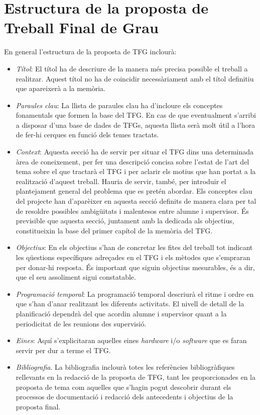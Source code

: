 \section{Estructura de la proposta de Treball Final de Grau}
En general l'estructura de la proposta de \ac{TFG} inclourà:
\begin{itemize}
\item \emph{Títol}: El títol ha de descriure de la manera més precisa possible el treball a realitzar. Aquest títol no ha de coincidir necessàriament amb el títol definitiu que apareixerà a la memòria.
\item \emph{Paraules clau}: La llista de paraules clau ha d'incloure els conceptes fonamentals que formen la base del \ac{TFG}. En cas de que eventualment s'arribi a disposar d'una base de dades de \ac{TFG}s, aquesta llista serà molt útil a l'hora de fer-hi cerques en funció dels temes tractats.
\item \emph{Context}: Aquesta secció ha de servir per situar el \ac{TFG} dins una determinada àrea de coneixement, per fer una descripció concisa sobre l'estat de l'art del tema sobre el que tractarà el \ac{TFG} i per aclarir els motius que han portat a la realització d'aquest treball. Hauria de servir, també, per introduir el plantejament general del problema que es pretén abordar. Els conceptes clau del projecte han d'aparèixer en aquesta secció definits de manera clara per tal de resoldre possibles ambigüitats i malentesos entre alumne i supervisor. És previsible que aquesta secció, juntament amb la dedicada als objectius, constitueixin la base del primer capítol de la memòria del \ac{TFG}.
\item \emph{Objectius}: En els objectius s'han de concretar les fites del treball tot indicant les qüestions específiques adreçades en el \ac{TFG} i els mètodes que s'empraran per donar-hi resposta. És important que siguin objectius mesurables, és a dir, que el seu assoliment sigui constatable.
\item \emph{Programació temporal}: La programació temporal descriurà el ritme i ordre en que s'han d'anar realitzant les diferents activitats. El nivell de detall de la planificació dependrà del que acordin alumne i supervisor quant a la periodicitat de les reunions des supervisió.
\item \emph{Eines}: Aquí s'explicitaran aquelles eines \emph{hardware} i/o \emph{software} que es faran servir per dur a terme el \ac{TFG}.
\item \emph{Bibliografia}. La bibliografia inclourà totes les referències bibliogràfiques rellevants en la redacció de la proposta de \ac{TFG}, tant les proporcionades en la proposta de tema com aquelles que s'hagin pogut descobrir durant els processos de documentació i redacció dels antecedents i objectius de la proposta final.
\end{itemize}

